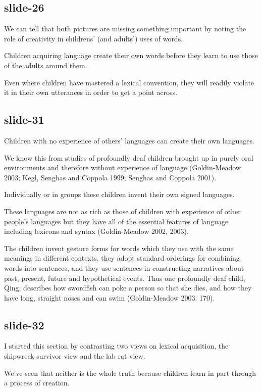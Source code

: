 \documentclass[12pt,\papersize]{extarticle}
\begin{document}
\subsection{slide-26}
We can tell that both pictures are missing something important by noting the role of creativity
in childrens' (and adults') uses of words.
 
Children acquiring language create their own words before they learn to use those of the adults around them.
 
Even where children have mastered a lexical convention, they will readily violate it in their own utterances in order to get a point across.
 
\subsection{slide-31}
Children with no experience of others' languages can create their own languages.
 
We know this from studies of profoundly deaf children brought up in purely oral environments and therefore without experience of language (Goldin-Meadow 2003; Kegl, Senghas and Coppola 1999; Senghas and Coppola 2001).
 
Individually or in groups these children invent their own signed languages.
 
These languages are not as rich as those of children with experience of other people's languages but they have all of the essential features of language including lexicons and syntax (Goldin-Meadow 2002, 2003).
 
The children invent gesture forms for words which they use with the same meanings in different contexts, they adopt standard orderings for combining words into sentences, and they use sentences in constructing narratives about past, present, future and hypothetical events.  Thus one profoundly deaf child, Qing, describes how swordfish can poke a person so that she dies, and how they have long, straight noses and can swim (Goldin-Meadow 2003: 170).
 
\subsection{slide-32}
I started this section by contrasting two views on lexical acquisition, the shipwreck survivor view and the lab rat view.
 
We've seen that neither is the whole truth because children learn in part through a process of creation.
 
\end{document}
